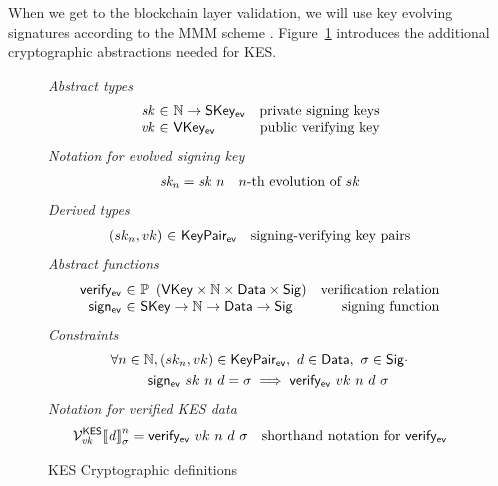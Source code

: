 When we get to the blockchain layer validation, we will use
key evolving signatures according to the MMM scheme \citep{cryptoeprint:2001:034}.
Figure~\ref{fig:kes-defs-shelley} introduces the additional cryptographic abstractions
needed for KES.


\begin{figure}[htb]
  \emph{Abstract types}
  \begin{equation*}
    \begin{array}{r@{~\in~}lr}
      \var{sk} & \N \to \SKeyEv & \text{private signing keys}\\
      \var{vk} & \VKeyEv & \text{public verifying key}\\
    \end{array}
  \end{equation*}
  \emph{Notation for evolved signing key}
  \begin{align*}
    & \mathit{sk_n} = \mathit{sk}~n & n\text{-th evolution of }sk
  \end{align*}
  \emph{Derived types}
  \begin{equation*}
    \begin{array}{r@{~\in~}lr}
      (sk_n, vk) & \KeyPairEv & \text{signing-verifying key pairs}
    \end{array}
  \end{equation*}
  \emph{Abstract functions}
  \begin{equation*}
    \begin{array}{r@{~\in~}lr}
      \fun{verify_{ev}} & \powerset{\left(\VKey \times \N \times \Data \times \Sig\right)}
                        & \text{verification relation}\\
      \fun{sign_{ev}} & \SKey \to \N \to \Data \to \Sig
                      & \text{signing function}\\
    \end{array}
  \end{equation*}
  \emph{Constraints}
  \begin{align*}
    & \forall n\in\mathbb{N}, (sk_n, vk) \in \mathsf{KeyPair_{ev}}, ~ d \in \mathsf{Data},~ \sigma \in \mathsf{Sig} \cdot \\
    & ~~~~~~~~\mathsf{sign_{ev}} ~ sk ~ n ~ d = \sigma \implies \mathsf{verify_{ev}} ~ vk ~ n ~ d ~ \sigma
  \end{align*}
  \emph{Notation for verified KES data}
  \begin{align*}
    & \mathcal{V}^{\mathsf{KES}}_{\mathit{vk}}{\llbracket \mathit{d} \rrbracket}_{\sigma}^n
        = \mathsf{verify_{ev}} ~ vk ~ n ~ d ~ \sigma
    & \text{shorthand notation for } \mathsf{verify_{ev}}
  \end{align*}
  \caption{KES Cryptographic definitions}
  \label{fig:kes-defs-shelley}
\end{figure}


